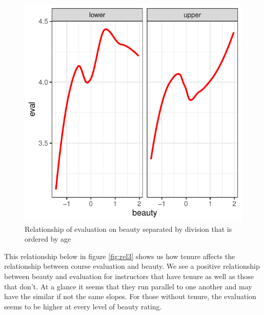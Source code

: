 \documentclass[
  12 pt,
]{article}
\begin{document}
\begin{figure}[H]

{\centering \includegraphics{18205420_Markdown--1-_files/figure-latex/rel2-1} 

}

\caption{Relationship of evaluation on beauty separated by division that is ordered by age}\label{fig:rel2}
\end{figure}
\newpage

This relationship below in figure \ref{fig:rel3} shows us how tenure affects the relationship between course evaluation and beauty. We see a positive relationship between beauty and evaluation for instructors that have tenure as well as those that don't. At a glance it seems that they run parallel to one another and may have the similar if not the same slopes. For those without tenure, the evaluation seems to be higher at every level of beauty rating.
\end{document}
